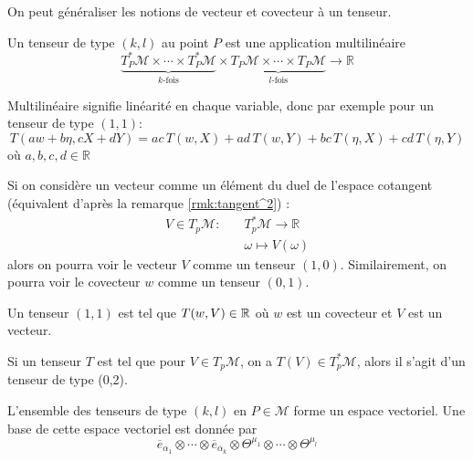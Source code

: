 On peut généraliser les notions de vecteur et covecteur à un tenseur. 
\begin{theoremframe}
    \begin{defi}
        Un tenseur de type $(k, l)$ au point $P$ est une application multilinéaire
        \begin{equation}
            \underbrace{T^*_{P}\mathcal{M} \times \cdots \times T^*_{P}\mathcal{M}}_\text{$k$-fois} \times \underbrace{T_{P}\mathcal{M} \times \cdots \times T_{P}\mathcal{M}}_\text{$l$-fois}  \to \mathbb{R}
        \end{equation}

        Multilinéaire signifie linéarité en chaque variable, donc par exemple pour un tenseur de type $(1,1)$: 
        \begin{equation}
        T(aw +b\eta, cX +dY) = ac \, T(w, X) + ad \, T(w, Y) + bc \, T(\eta, X) +cd \, T(\eta, Y)
        \end{equation}
        où $a,b, c ,d \in \mathbb{R}$
    \end{defi}
\end{theoremframe}
\begin{exmp}
    Si on considère un vecteur comme un élément du duel de l'espace cotangent (équivalent d'après la remarque \ref{rmk:tangent^2}) :
\begin{align}
    V \in T_{p}\mathcal{M} : \quad &T^*_{p}\mathcal{M} \longrightarrow \mathbb{R}\\
    & \omega \longmapsto V(\omega)
\end{align}
alors on pourra voir le vecteur $V$ comme un tenseur $(1, 0)$. Similairement, on pourra voir le covecteur $w$ comme un tenseur $(0, 1)$. 
\end{exmp}
\begin{exmp}
    Un tenseur $(1, 1)$ est tel que $T(w,V) \in \mathbb{R}$ où $w$ est un covecteur et $V$ est un vecteur. 
\end{exmp}
\begin{exmp}
    Si un tenseur $T$ est tel que pour $V\in T_p\mathcal{M}$, on a $T(V) \in T^*_p\mathcal{M}$, alors il s'agit d'un tenseur de type (0,2).
\end{exmp}
\begin{theoremframe}
    \begin{propri}
        L'ensemble des tenseurs de type $(k, l)$ en $P\in \mathcal{M}$ forme un espace vectoriel. Une base de cette espace vectoriel est donnée par 
        \begin{equation}
        \overline{e}_{\alpha_1} \otimes \cdots \otimes \overline{e}_{\alpha_k} \otimes \Theta^{\mu _1}\otimes \cdots \otimes \Theta^{\mu _l}
        \end{equation}
    \end{propri}
\end{theoremframe}
